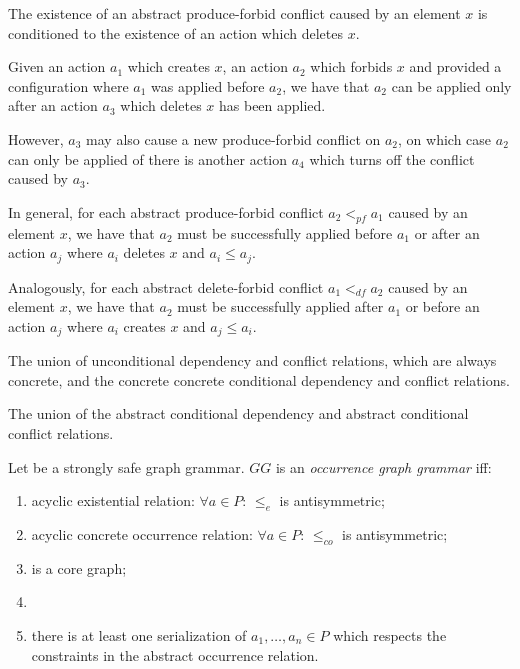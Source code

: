\begin{remark} The existence of an abstract produce-forbid conflict caused by an element $x$ is conditioned to the existence of an action which deletes $x$. 
  
  Given an action $a_1$ which creates $x$, an action $a_2$ which forbids $x$ and provided a configuration where $a_1$ was applied before $a_2$, we have that $a_2$ can be applied only after an action $a_3$ which deletes $x$ has been applied. 
  
  However, $a_3$ may also cause a new produce-forbid conflict on $a_2$, on which case $a_2$ can only be applied of there is another action $a_4$ which turns off the conflict caused by $a_3$.

  In general, for each abstract produce-forbid conflict $a_2 <_{pf} a_1$ caused by an element $x$, we have that $a_2$ must be successfully applied before $a_1$ or after an action $a_{j}$ where $a_i$ deletes $x$ and $a_i \leq a_j$.

  Analogously, for each abstract delete-forbid conflict $a_1 <_{df} a_2$ caused by an element $x$, we have that $a_2$ must be successfully applied after $a_1$ or before an action $a_j$ where $a_i$ creates $x$ and $a_j \leq a_i$.
\end{remark}

\begin{definition} The union of unconditional dependency and conflict relations, which are always concrete, and the concrete concrete conditional dependency and conflict relations.
\end{definition}

\begin{definition} The union of the abstract conditional dependency and abstract conditional conflict relations.
\end{definition}

\begin{definition}
\end{definition}

\begin{definition} Let \doublyTypedGraphGrammarCore{} be a strongly safe graph grammar. $GG$ is an \emph{occurrence graph grammar} iff:

  \begin{enumerate}
    \item acyclic existential relation: $\forall a \in P$: $\leq_e$ is antisymmetric;
    \item acyclic concrete occurrence relation: $\forall a \in P$: $\leq_{co}$ is antisymmetric;
    \item \coreGraph{} is a core graph;
    \item {}
    \item there is at least one serialization of $a_1,\ldots,a_n \in P$ which respects the constraints in the abstract occurrence relation.
  \end{enumerate}
\end{definition}

